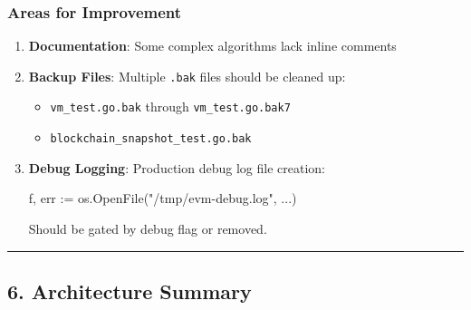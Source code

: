 \documentclass[
]{article}
\newenvironment{Shaded}{}{}
\newcommand{\NormalTok}[1]{#1}
\newcommand{\OperatorTok}[1]{\textcolor[rgb]{0.40,0.40,0.40}{#1}}
\newcommand{\StringTok}[1]{\textcolor[rgb]{0.25,0.44,0.63}{#1}}
\providecommand{\tightlist}{%
  \setlength{\itemsep}{0pt}\setlength{\parskip}{0pt}}
\begin{document}
\subsubsection{Areas for Improvement}\label{areas-for-improvement}

\begin{enumerate}
\def\labelenumi{\arabic{enumi}.}
\item
  \textbf{Documentation}: Some complex algorithms lack inline comments
\item
  \textbf{Backup Files}: Multiple \texttt{.bak} files should be cleaned
  up:

  \begin{itemize}
  \tightlist
  \item
    \texttt{vm\_test.go.bak} through \texttt{vm\_test.go.bak7}
  \item
    \texttt{blockchain\_snapshot\_test.go.bak}
  \end{itemize}
\item
  \textbf{Debug Logging}: Production debug log file creation:

\begin{Shaded}
\begin{Highlighting}[]
\NormalTok{f}\OperatorTok{,}\NormalTok{ err }\OperatorTok{:=}\NormalTok{ os}\OperatorTok{.}\NormalTok{OpenFile}\OperatorTok{(}\StringTok{"/tmp/evm{-}debug.log"}\OperatorTok{,} \OperatorTok{...)}
\end{Highlighting}
\end{Shaded}

  Should be gated by debug flag or removed.
\end{enumerate}

\begin{center}\rule{0.5\linewidth}{0.5pt}\end{center}

\subsection{6. Architecture Summary}\label{6-architecture-summary}
\end{document}

